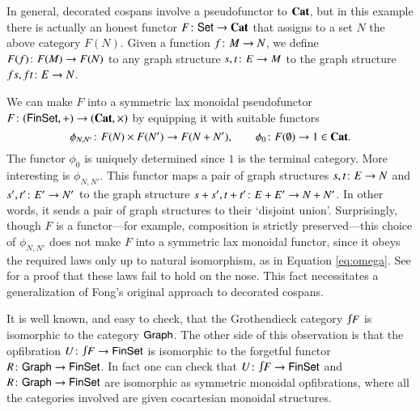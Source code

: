 \documentclass[reqno]{amsart}
\begin{document}
In general, decorated cospans involve a pseudofunctor to $\mathbf{Cat}$, but in this example there is actually an honest functor $F \colon \mathsf{Set} \to \mathbf{Cat}$ that assigns to a set $N$ the above category $F(N)$.   Given a function $f \colon M \to N$, we define $F(f) \colon F(M) \to F(N)$ to any graph structure $s,t \colon E \to M$ to the graph structure $f s, f t \colon E \to N$.   

We can make $F$ into a symmetric lax monoidal pseudofunctor $F \colon (\mathsf{Fin}\mathsf{Set}, +) \to (\mathbf{Cat},\times)$ by equipping it with suitable functors 
\[   \phi_{N,N'} \colon F(N) \times F(N') \to F(N+N'), \qquad \phi_0 \colon F(\emptyset) \to 1 \in \mathbf{Cat}. \]  
The functor $\phi_0$ is uniquely determined since $1$ is the terminal category.   More interesting is $\phi_{N,N'}$.   This functor maps a pair of graph structures $s, t \colon E \to N$ and $s',t' \colon E' \to N'$ to the graph structure $s+s', t+t' \colon E+E' \to N+N'$.  In other words, it sends a pair of graph structures to their `disjoint union'.   Surprisingly, though $F$ is a functor---for example, composition is strictly preserved---this choice of $\phi_{N,N'}$ does not make $F$ into a symmetric lax monoidal functor, since it obeys the required laws only up to natural isomorphism, as in Equation \cref{eq:omega}.   See \cite[Section 5]{BC} for a proof that these laws fail to hold on the nose.   This fact necessitates a generalization of Fong's original approach to decorated cospans.


It is well known, and easy to check, that the Grothendieck category $\inta F$ is isomorphic to the category $\mathsf{Graph}$.   The other side of this observation is that the opfibration $U \maps \inta F \to \Fin\Set$ is isomorphic to the forgetful functor $R \colon \mathsf{Graph} \to \mathsf{Fin}\mathsf{Set}$.    In fact one can check that $U \maps \inta F \to \Fin\Set$ and $R \colon \mathsf{Graph} \to \mathsf{Fin}\mathsf{Set}$ are isomorphic as symmetric monoidal opfibrations, where all the categories involved are given cocartesian monoidal structures.
\end{document}
